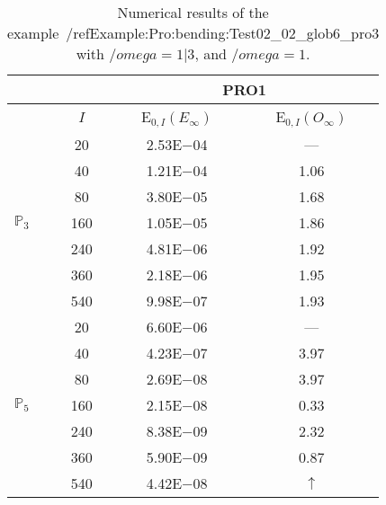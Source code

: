 \begin{table}[H]
\caption{Numerical results of the example~/ref{Example:Pro:bending:Test02_02_glob6_pro3} with $/omega=1|3$, and $/omega=1$.}
\setlength{\tabcolsep}{5pt}
\centering
\begin{tabular}{@{}l c c c@{}}
\toprule
 &  & \multicolumn{2}{c}{PRO1}\\
\midrule
 & $I$ & E$_{0,I}(E_{\infty})$ & E$_{0,I}(O_{\infty})$\\
\midrule
\multirow{7}{*}{$\mathbb{P}_{3}$}
 & 20 & 2.53E$-$04 & ---\\
 & 40 & 1.21E$-$04 & 1.06\\
 & 80 & 3.80E$-$05 & 1.68\\
 & 160 & 1.05E$-$05 & 1.86\\
 & 240 & 4.81E$-$06 & 1.92\\
 & 360 & 2.18E$-$06 & 1.95\\
 & 540 & 9.98E$-$07 & 1.93\\
\midrule
\multirow{7}{*}{$\mathbb{P}_{5}$}
 & 20 & 6.60E$-$06 & ---\\
 & 40 & 4.23E$-$07 & 3.97\\
 & 80 & 2.69E$-$08 & 3.97\\
 & 160 & 2.15E$-$08 & 0.33\\
 & 240 & 8.38E$-$09 & 2.32\\
 & 360 & 5.90E$-$09 & 0.87\\
 & 540 & 4.42E$-$08 & $\uparrow$\\
\bottomrule
\end{tabular}
\label{Table:PRO:test_02_02_test22_pro3}
\end{table}
